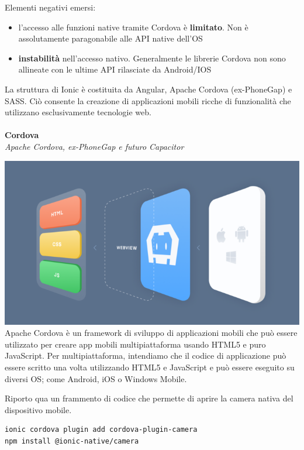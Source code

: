 Elementi negativi emersi:
\begin{itemize}
    \item l'accesso alle funzioni native tramite Cordova è \textbf{limitato}. Non è assolutamente paragonabile alle API native dell'OS
    \item \textbf{instabilità} nell'accesso nativo. Generalmente le librerie Cordova non sono allineate con le ultime API rilasciate da Android/IOS
\end{itemize}

La struttura di Ionic è costituita da Angular, Apache Cordova (ex-PhoneGap) e SASS. Ciò consente la creazione di applicazioni mobili ricche di funzionalità che utilizzano esclusivamente tecnologie web.
\paragraph{}
\textbf{Cordova}\\
\textit{Apache Cordova, ex-PhoneGap e futuro Capacitor}

\includegraphics[scale=0.80]{img/cap2/cordova}\\

Apache Cordova è un framework di sviluppo di applicazioni mobili che può essere utilizzato per creare app mobili multipiattaforma usando HTML5 e puro JavaScript. 
Per multipiattaforma, intendiamo che il codice di applicazione può essere scritto una volta utilizzando HTML5 e JavaScript e può essere eseguito su diversi OS; come Android, iOS o Windows Mobile.

Riporto qua un frammento di codice che permette di aprire la camera nativa del dispositivo mobile.

\begin{lstlisting}
ionic cordova plugin add cordova-plugin-camera
npm install @ionic-native/camera
\end{lstlisting}

